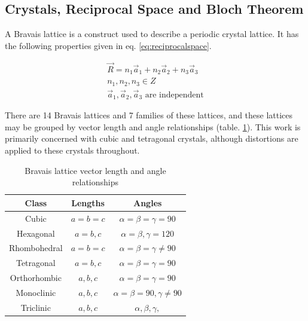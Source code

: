 \subsection{Crystals, Reciprocal Space and Bloch Theorem}
\label{section:crystalsrecipbloch}

A Bravais lattice is a construct used to describe a periodic crystal lattice.  It has the following properties given in eq. \ref{eq:reciprocalspace}. 

\begin{equation}
  \begin{split}
    \vec{R} = n_1 \vec{a}_1 + n_2 \vec{a}_2 + n_3 \vec{a}_3 \\
    n_1 , n_2, n_3 \in Z \\
    \vec{a}_1, \vec{a}_2, \vec{a}_3 \text{ are independent}
  \end{split}
  \label{eq:reciprocalspace}
\end{equation}

There are 14 Bravais lattices and 7 families of these lattices, and these lattices may be grouped by vector length and angle relationships (table. \ref{table:bravaisvectors}).  This work is primarily concerned with cubic and tetragonal crystals, although distortions are applied to these crystals throughout.

\begin{table}[h]
\begin{center}
\renewcommand{\arraystretch}{1.2}
\begin{tabular}{c c c}
\hline\hline
Class & Lengths & Angles \\
\hline\hline
Cubic & $a = b = c$ & $ \alpha = \beta = \gamma = 90 $ \\
Hexagonal & $a = b, c $ & $ \alpha = \beta, \gamma = 120 $ \\
Rhombohedral & $a = b = c $ & $ \alpha = \beta = \gamma \neq 90 $ \\
Tetragonal & $a = b, c $ & $ \alpha = \beta = \gamma = 90 $ \\
Orthorhombic & $a, b, c $ & $ \alpha = \beta = \gamma = 90 $ \\
Monoclinic & $a, b, c $ & $ \alpha = \beta = 90, \gamma \neq 90 $ \\
Triclinic & $a, b, c $ & $ \alpha, \beta, \gamma, $ \\
\hline
\end{tabular}
\caption{Bravais lattice vector length and angle relationships}
\label{table:bravaisvectors}
\end{center}
\end{table}



